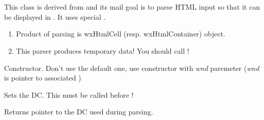 %
%


\section{}\label{wxhtmlwinparser}


This class is derived from  and 
its mail goal is to parse HTML input so that it can be displayed in
. It uses special 
.


\begin{enumerate}
\item Product of parsing is wxHtmlCell (resp. wxHtmlContainer) object.
\item This parser produces temporary data! You should call 
!
\end{enumerate}







\label{wxhtmlwinparserwxhtmlwinparser}



Constructor. Don't use the default one, use constructor with
{\it wnd} paremeter ({\it wnd} is pointer to associated )


\label{wxhtmlwinparsersetdc}


Sets the DC. This must be called before !

\label{wxhtmlwinparsergetdc}


Returns pointer to the DC used during parsing.

\label{wxhtmlwinparsergetcharheight}

